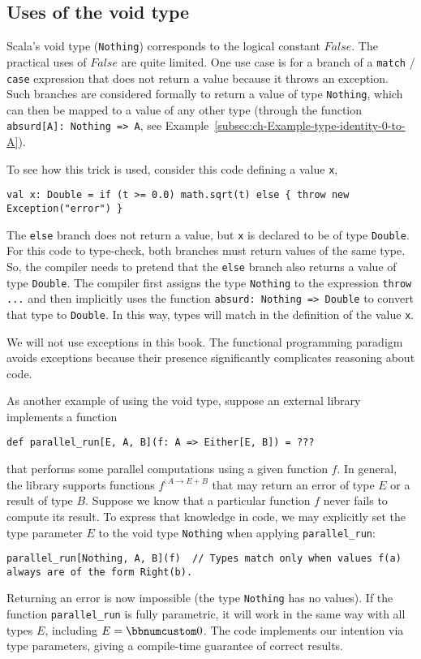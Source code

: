 \subsection{Uses of the void type}

Scala\textsf{'}s void type (\lstinline!Nothing!) corresponds
to the logical constant $False$. The practical uses of $False$ are
quite limited. One use case is for a branch of a \lstinline!match!
/ \lstinline!case! expression that does not return a value because
it throws an exception. Such branches are considered
formally to return a value of type \lstinline!Nothing!, which can
then be mapped to a value of any other type (through the function
\lstinline!absurd[A]: Nothing => A!, see Example~\ref{subsec:ch-Example-type-identity-0-to-A}). 

To see how this trick is used, consider this code defining a value
\lstinline!x!,
\begin{lstlisting}
val x: Double = if (t >= 0.0) math.sqrt(t) else { throw new Exception("error") }
\end{lstlisting}
The \lstinline!else! branch does not return a value, but \lstinline!x!
is declared to be of type \lstinline!Double!. For this code to type-check,
both branches must return values of the same type. So, the compiler
needs to pretend that the \lstinline!else! branch also returns a
value of type \lstinline!Double!. The compiler first assigns the
type \lstinline!Nothing! to the expression \lstinline!throw ...!
and then implicitly uses the function \lstinline!absurd: Nothing => Double!
to convert that type to \lstinline!Double!. In this way, types will
match in the definition of the value \lstinline!x!. 

We will not use exceptions in this book. The functional programming
paradigm avoids exceptions because their presence significantly complicates
reasoning about code.

As another example of using the void type, suppose an external library
implements a function
\begin{lstlisting}
def parallel_run[E, A, B](f: A => Either[E, B]) = ???
\end{lstlisting}
that performs some parallel computations using a given function $f$.
In general, the library supports functions $f^{:A\rightarrow E+B}$
that may return an error of type $E$ or a result of type $B$. Suppose
we know that a particular function $f$ never fails to compute its
result. To express that knowledge in code, we may explicitly set the
type parameter $E$ to the void type \lstinline!Nothing! when applying
\lstinline!parallel_run!:
\begin{lstlisting}
parallel_run[Nothing, A, B](f)  // Types match only when values f(a) always are of the form Right(b). 
\end{lstlisting}
Returning an error is now impossible (the type \lstinline!Nothing!
has no values). If the function \lstinline!parallel_run! is fully
parametric, it will work in the same way with all types $E$, including
$E=\bbnum 0$. The code implements our intention via type parameters,
giving a compile-time guarantee of correct results.

